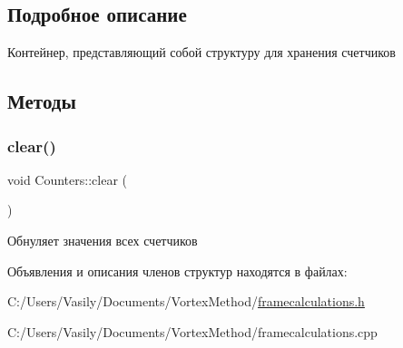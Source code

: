 \subsection{Подробное описание}
Контейнер, представляющий собой структуру для хранения счетчиков 

\subsection{Методы}
\mbox{\label{struct_counters_ada46b45bb45210aad28a4ebbd23f98f8}} 
\subsubsection{\texorpdfstring{clear()}{clear()}}
{\footnotesize\ttfamily void Counters\+::clear (\begin{DoxyParamCaption}{ }\end{DoxyParamCaption})}

Обнуляет значения всех счетчиков 

Объявления и описания членов структур находятся в файлах\+:\begin{DoxyCompactItemize}
\item 
C\+:/\+Users/\+Vasily/\+Documents/\+Vortex\+Method/\mbox{\hyperlink{framecalculations_8h}{framecalculations.\+h}}\item 
C\+:/\+Users/\+Vasily/\+Documents/\+Vortex\+Method/framecalculations.\+cpp\end{DoxyCompactItemize}
